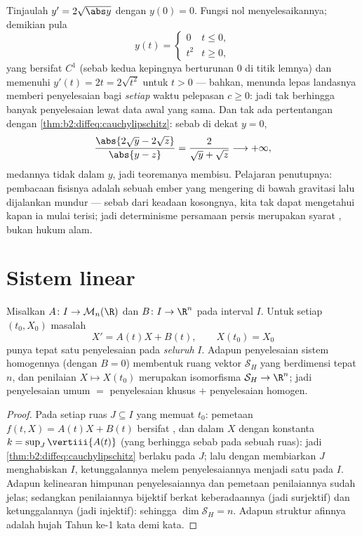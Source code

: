 \begin{example}\label{ex:b2:diffeq:leaky}
Tinjaulah $y' = 2\sqrt{\abs y}$ dengan $y(0) = 0$. Fungsi nol
menyelesaikannya; demikian pula
\[
y(t) = \begin{cases} 0 & t \leq 0,\\ t^2 & t \geq 0,
\end{cases}
\]
yang bersifat $C^1$ (sebab kedua kepingnya berturunan $0$ di titik
lemnya) dan memenuhi $y'(t) = 2t = 2\sqrt{t^2}$ untuk $t > 0$ ---
bahkan, menunda lepas landasnya memberi penyelesaian bagi \emph{setiap}
waktu pelepasan $c \geq 0$: jadi tak berhingga banyak penyelesaian lewat
data awal yang sama. Dan tak ada pertentangan dengan
\cref{thm:b2:diffeq:cauchylipschitz}: sebab di dekat $y = 0$,
\[
\frac{\abs{2\sqrt y - 2\sqrt z}}{\abs{y - z}}
= \frac{2}{\sqrt y + \sqrt z} \longrightarrow +\infty ,
\]
medannya tidak  dalam $y$, jadi teoremanya membisu.
Pelajaran penutupnya: pembacaan fisisnya adalah sebuah ember yang mengering
di bawah gravitasi lalu dijalankan mundur --- sebab dari keadaan kosongnya, kita
tak dapat mengetahui kapan ia mulai terisi; jadi determinisme persamaan 
persis merupakan syarat , bukan hukum alam.
\end{example}

\section{Sistem linear}

\begin{theorem}\label{thm:b2:diffeq:linear}
Misalkan $A \colon I \to \mathcal{M}_n(\R)$ dan $B \colon I \to \R^n$
 pada interval $I$. Untuk setiap $(t_0, X_0)$ masalah
\[
X' = A(t)X + B(t), \qquad X(t_0) = X_0
\]
punya tepat satu penyelesaian pada \emph{seluruh} $I$. Adapun penyelesaian
sistem homogennya (dengan $B = 0$) membentuk ruang vektor $\mathcal{S}_H$ yang
berdimensi tepat $n$, dan penilaian $X \mapsto X(t_0)$ merupakan
isomorfisma $\mathcal{S}_H \to \R^n$; jadi penyelesaian umum $=$
penyelesaian khusus $+$ penyelesaian homogen.
\end{theorem}

\begin{proof}
Pada setiap ruas $J \subseteq I$ yang memuat $t_0$: pemetaan $f(t, X) =
A(t)X + B(t)$ bersifat , dan  dalam $X$ dengan konstanta $k
= \sup_J \vertiii{A(t)}$ (yang berhingga sebab  pada sebuah ruas):
jadi \cref{thm:b2:diffeq:cauchylipschitz} berlaku pada $J$; lalu dengan membiarkan $J$
menghabiskan $I$, ketunggalannya melem penyelesaiannya menjadi satu pada $I$.
Adapun kelinearan himpunan penyelesaiannya dan pemetaan penilaiannya sudah jelas;
sedangkan penilaiannya bijektif berkat keberadaannya (jadi surjektif) dan ketunggalannya
(jadi injektif): sehingga $\dim \mathcal{S}_H = n$. Adapun struktur afinnya adalah hujah
Tahun ke-1 kata demi kata.
\end{proof}

